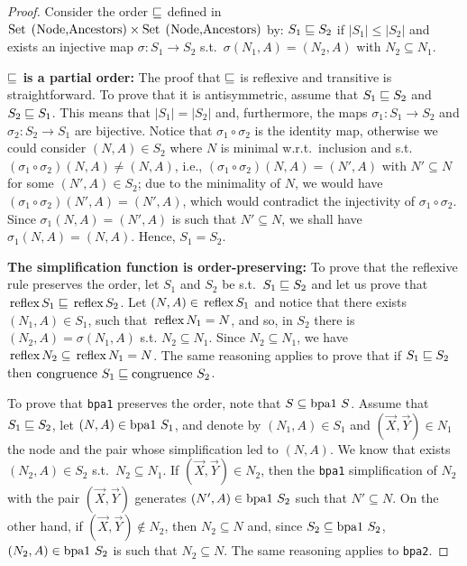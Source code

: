 \begin{proof}
	Consider the order 
	$\sqsubseteq$ defined in $\text{\lstinline{Set (Node,Ancestors)}}
	\times \text{\lstinline{Set (Node,Ancestors)}}$ by:
	$S_1 \sqsubseteq S_2$ if $|S_1| \leq |S_2|$ and
	exists an injective map $\sigma : S_1 \rightarrow S_2$ s.t.\  
	$\sigma(N_1,A) = (N_2,A)$ with $N_2\subseteq N_1$.\smallskip
	
	\noindent\textbf{$\sqsubseteq$ is a partial order:} The proof that
	$\sqsubseteq$ is reflexive and transitive is straightforward. 
	To prove that it is 
	antisymmetric, assume that $S_1\sqsubseteq S_2$ and $S_2 \sqsubseteq S_1$.
	This means that $|S_1|=|S_2|$ and, furthermore, the maps 
	$\sigma_1 : S_1 \rightarrow S_2$ and $\sigma_2 : S_2 \rightarrow S_1$
	are bijective. Notice that $\sigma_1\circ \sigma_2$  
	is the identity map, otherwise we could consider $(N,A)\in S_2$
	where $N$ is minimal w.r.t.\ inclusion and s.t.\
	$(\sigma_1\circ \sigma_2)(N,A) \neq (N,A)$, i.e.,
	$(\sigma_1\circ \sigma_2)(N,A) = (N',A)$ with $N'\subseteq N$ 
	for some $(N',A)\in S_2$;
	due to the minimality of $N$, we would have 
	$(\sigma_1\circ \sigma_2)(N',A) = (N',A)$, which would contradict the
	injectivity of $\sigma_1\circ \sigma_2$. Since
	$\sigma_1 (N,A) = (N',A)$ is such that $N'\subseteq N$, we shall 
	have $\sigma_1 (N,A) = (N,A)$. Hence, $S_1=S_2$.\smallskip
	
	\noindent\textbf{The simplification function is order-preserving:}
	To prove that the reflexive rule preserves the order, let $S_1$ and 
	$S_2$ be s.t.\ $S_1\sqsubseteq S_2$ and let us prove that 
	$\text{\lstinline{reflex}} S_1\leqSets\text{\lstinline{reflex}}S_2$.
	Let $(N,A)\in \text{\lstinline{reflex}} S_1$
	and notice that there exists $(N_1,A)\in S_1$, such that
	$\text{\lstinline{reflex}} N_1 = N $, and so,
	in $S_2$ there is $(N_2,A)=\sigma(N_1,A)$ s.t. $N_2\subseteq N_1$. 
	Since $N_2\subseteq N_1$, we have
	$\text{\lstinline{reflex}} N_2 \subseteq
    \text{\lstinline{reflex}} N_1 = N$.
	The same reasoning applies to prove that if $S_1\sqsubseteq S_2$ then 
	$\text{\lstinline{congruence} } S_1\leqSets\text{\lstinline{congruence} }S_2$.
	
	To prove that \lstinline{bpa1} preserves the order,
	note that 
	$S \subseteq \text{\lstinline{bpa1} }S$. Assume that 
	$S_1\sqsubseteq S_2$, let $(N,A)\in \text{\lstinline{bpa1} }S_1$, 
	and denote by $(N_1,A)\in S_1$ and $(\vec X,\vec Y)\in N_1$  
	the node and the pair whose simplification 
	led to $(N,A)$. We know that exists $(N_2,A)\in S_2$
	s.t.\ $N_2 \subseteq N_1$. If $(\vec X,\vec Y)\in N_2$,
	then the \lstinline{bpa1} simplification of $N_2$ with
	the pair $(\vec X,\vec Y)$ generates 
	$(N',A)\in \text{\lstinline{bpa1} }S_2$ such that 
	$N'\subseteq N$. On the other hand, if 
	$(\vec X,\vec Y)\not \in N_2$, then $N_2\subseteq N$ 
	and, since  $S_2 \subseteq \text{\lstinline{bpa1} }S_2$,
	$(N_2,A)\in \text{\lstinline{bpa1} }S_2$ is such that
	$N_2\subseteq N$.
	The same reasoning applies to \lstinline{bpa2}. 
	

\end{proof}
